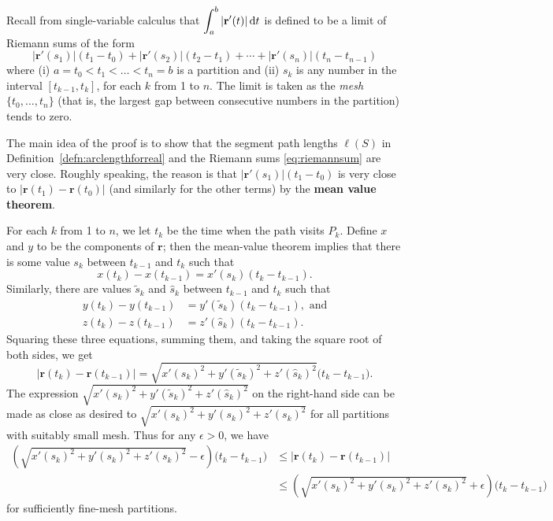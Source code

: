 \documentclass[prettycode,shellescape]{watsonbook}
\begin{document}
\begin{pf}[title=Proof (idea)]
  Recall from single-variable calculus that
  $\displaystyle{\int_a^b |\mathbf{r}'(t)| \, \mathrm{d}t}$ is defined to be a limit of
  Riemann sums of the form
  \begin{equation} \label{eq:riemannsum}
    |\mathbf{r}'(s_1)|(t_1-t_0) + |\mathbf{r}'(s_2)|(t_2-t_1) + \cdots + |\mathbf{r}'(s_n)|(t_n-t_{n-1})
  \end{equation}
  where (i) $a = t_0 < t_1 < \ldots < t_n = b$ is a partition and
  (ii) $s_k$ is any number in the interval $[t_{k-1},t_k]$, for each
  $k$ from 1 to $n$. The limit is taken as the \textit{mesh}
  $\{t_0, \ldots, t_n\}$ (that is, the largest gap between
  consecutive numbers in the partition) tends to zero. 

  The main idea of the proof is to show that the segment path
  lengths $\ell(S)$ in Definition~\ref{defn:arclengthforreal} and
  the Riemann sums \eqref{eq:riemannsum} are very close. Roughly
  speaking, the reason is that $|\mathbf{r}'(s_1)|(t_1-t_0)$ is very
  close to $|\mathbf{r}(t_1) - \mathbf{r}(t_0)|$ (and similarly for
  the other terms) by the \textbf{mean value theorem}.

  For each $k$ from 1 to $n$, we let $t_k$ be the time when the path
  visits $P_k$. Define $x$ and $y$ to be the components of
  $\mathbf{r}$; then the mean-value theorem implies that there is
  some value $s_k$ between $t_{k-1}$ and $t_k$ such that 
  \[
    x(t_k) - x(t_{k-1}) = x'(s_k)(t_{k}-t_{k-1}). 
  \]
  Similarly, there are values $\tilde{s}_k$ and $\hat{s}_k$ between
  $t_{k-1}$ and $t_k$ such that
  \begin{align*}
    y(t_k) - y(t_{k-1}) &= y'(\tilde{s}_k)(t_{k}-t_{k-1}), \text{ and}\\
    z(t_k) - z(t_{k-1}) &= z'(\hat{s}_k)(t_{k}-t_{k-1}). 
  \end{align*}
  Squaring these three equations, summing them, and taking the
  square root of both sides, we get
  \[
    |\mathbf{r}(t_k) - \mathbf{r}(t_{k-1})| = \sqrt{x'(s_k)^2 +
      y'(\tilde{s}_k)^2 + z'(\hat{s}_k)^2}\bigg(t_k-t_{k-1}\bigg). 
  \]
  The expression
  $\sqrt{x'(s_k)^2 + y'(\tilde{s}_k)^2 + z'(\hat{s}_k)^2}$ on the
  right-hand side can be made as close as desired to
  $\sqrt{x'(s_k)^2 + y'({s}_k)^2 + z'({s}_k)^2}$ for all partitions
  with suitably small mesh. Thus for any $\epsilon > 0$, we have
  \begin{align} \label{eq:ineq}
    \left(\sqrt{x'(s_k)^2 +
    y'({s}_k)^2 + z'({s}_k)^2} - \epsilon\right)
    \bigg(t_k-t_{k-1}\bigg)  
    &\leq
      |\mathbf{r}(t_k) - \mathbf{r}(t_{k-1})| \\ \nonumber
    &\leq \left(\sqrt{x'(s_k)^2 +
      y'({s}_k)^2 + z'({s}_k)^2} + \epsilon\right) \bigg(t_k-t_{k-1}\bigg)
  \end{align}
  for sufficiently fine-mesh partitions. 
  

\end{pf}
\end{document}
